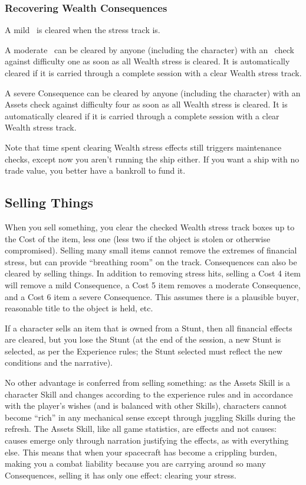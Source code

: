 \subsubsection{Recovering Wealth Consequences}

A mild \Consequence\ is cleared when the stress track is.

A moderate \Consequence\ can be cleared by anyone (including the character) with an \Assets\ check against difficulty one as soon as all Wealth stress is cleared. It is automatically cleared if it is carried through a complete session with a clear Wealth stress track.

A severe Consequence can be cleared by anyone (including the character) with an Assets check against difficulty four as soon as all Wealth stress is cleared. It is automatically cleared if it is carried through a complete session with a clear Wealth stress track.

Note that time spent clearing Wealth stress effects still triggers maintenance checks, except now you aren't running the ship either. If you want a ship with no trade value, you better have a bankroll to fund it.

\subsection{Selling Things}\label{sec:Selling Things}

When you sell something, you clear the checked Wealth stress track boxes up to the Cost of the item, less one (less two if the object is stolen or otherwise compromised).  Selling many small items cannot remove the extremes of financial stress, but can provide ``breathing room'' on the track. Consequences can also be cleared by selling things. In addition to removing stress hits, selling a Cost 4 item will remove a mild Consequence, a Cost 5 item removes a moderate Consequence, and a Cost 6 item a severe Consequence. This assumes there is a plausible buyer, reasonable title to the object is held, etc.

If a character sells an item that is owned from a Stunt, then all financial effects are cleared, but you lose the Stunt (at the end of the session, a new Stunt is selected, as per the Experience rules; the Stunt selected must reflect the new conditions and the narrative).

No other advantage is conferred from selling something: as the Assets Skill is a character Skill and changes according to the experience rules and in accordance with the player's wishes (and is balanced with other Skills), characters cannot become ``rich'' in any mechanical sense except through juggling Skills during the refresh. The Assets Skill, like all game statistics, are effects and not causes: causes emerge only through narration justifying the effects, as with everything else. This means that when your spacecraft has become a crippling burden, making you a combat liability because you are carrying around so many Consequences, selling it has only one effect: clearing your stress.


